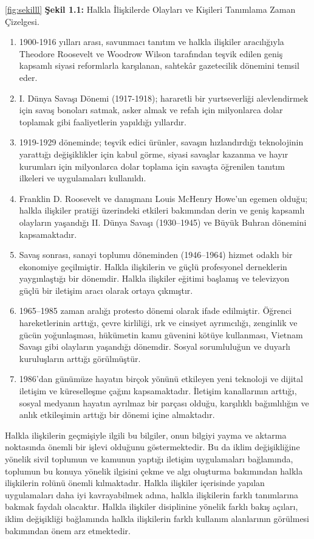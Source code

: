 \documentclass[
]{book}
\providecommand{\tightlist}{%
  \setlength{\itemsep}{0pt}\setlength{\parskip}{0pt}}
\begin{document}
\ref{fig:sekilll}
\textbf{Şekil 1.1:} Halkla İlişkilerde Olayları ve Kişileri Tanımlama Zaman Çizelgesi.

\begin{enumerate}
\def\labelenumi{\arabic{enumi}.}
\tightlist
\item
  1900-1916 yılları arası, savunmacı tanıtım ve halkla ilişkiler aracılığıyla Theodore Roosevelt ve Woodrow Wilson tarafından teşvik edilen geniş kapsamlı siyasi reformlarla karşılanan, sahtekâr gazetecilik dönemini temsil eder.
\item
  I. Dünya Savaşı Dönemi (1917-1918); hararetli bir yurtseverliği alevlendirmek için savaş bonoları satmak, asker almak ve refah için milyonlarca dolar toplamak gibi faaliyetlerin yapıldığı yıllardır.
\item
  1919-1929 döneminde; teşvik edici ürünler, savaşın hızlandırdığı teknolojinin yarattığı değişiklikler için kabul görme, siyasi savaşlar kazanma ve hayır kurumları için milyonlarca dolar toplama için savaşta öğrenilen tanıtım ilkeleri ve uygulamaları kullanıldı.
\item
  Franklin D. Roosevelt ve danışmanı Louis McHenry Howe'un egemen olduğu; halkla ilişkiler pratiği üzerindeki etkileri bakımından derin ve geniş kapsamlı olayların yaşandığı II. Dünya Savaşı (1930--1945) ve Büyük Buhran dönemini kapsamaktadır.
\item
  Savaş sonrası, sanayi toplumu döneminden (1946--1964) hizmet odaklı bir ekonomiye geçilmiştir. Halkla ilişkilerin ve güçlü profesyonel derneklerin yaygınlaştığı bir dönemdir. Halkla ilişkiler eğitimi başlamış ve televizyon güçlü bir iletişim aracı olarak ortaya çıkmıştır.
\item
  1965--1985 zaman aralığı protesto dönemi olarak ifade edilmiştir. Öğrenci hareketlerinin arttığı, çevre kirliliği, ırk ve cinsiyet ayrımcılığı, zenginlik ve gücün yoğunlaşması, hükümetin kamu güvenini kötüye kullanması, Vietnam Savaşı gibi olayların yaşandığı dönemdir. Sosyal sorumluluğun ve duyarlı kuruluşların arttığı görülmüştür.
\item
  1986'dan günümüze hayatın birçok yönünü etkileyen yeni teknoloji ve dijital iletişim ve küreselleşme çağını kapsamaktadır. İletişim kanallarının arttığı, sosyal medyanın hayatın ayrılmaz bir parçası olduğu, karşılıklı bağımlılığın ve anlık etkileşimin arttığı bir dönemi içine almaktadır.
\end{enumerate}

Halkla ilişkilerin geçmişiyle ilgili bu bilgiler, onun bilgiyi yayma ve aktarma noktasında önemli bir işlevi olduğunu göstermektedir. Bu da iklim değişikliğine yönelik sivil toplumun ve kamunun yaptığı iletişim uygulamaları bağlamında, toplumun bu konuya yönelik ilgisini çekme ve algı oluşturma bakımından halkla ilişkilerin rolünü önemli kılmaktadır. Halkla ilişkiler içerisinde yapılan uygulamaları daha iyi kavrayabilmek adına, halkla ilişkilerin farklı tanımlarına bakmak faydalı olacaktır. Halkla ilişkiler disiplinine yönelik farklı bakış açıları, iklim değişikliği bağlamında halkla ilişkilerin farklı kullanım alanlarının görülmesi bakımından önem arz etmektedir.
\end{document}
